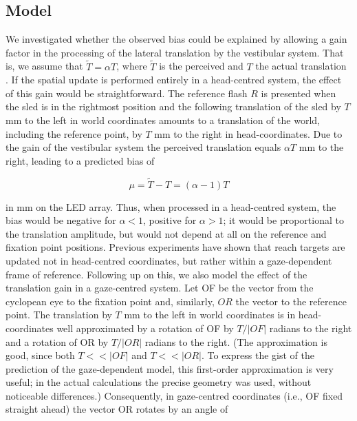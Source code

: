 \subsection{Model}
\label{p2:sec:model}

We investigated whether the observed bias could be explained by allowing a gain factor in the processing of the lateral translation by the vestibular system. That is, we assume that $\tilde{T} = {\alpha}T$, where $\tilde{T}$ is the perceived and $T$ the actual translation \cite{medendorp1999}. If the spatial update is performed entirely in a head-centred system, the effect of this gain would be straightforward. The reference flash $R$ is presented when the sled is in the rightmost position and the following translation of the sled by $T$ mm to the left in world coordinates amounts to a translation of the world, including the reference point, by $T$ mm to the right in head-coordinates. Due to the gain of the vestibular system the perceived translation equals ${\alpha}T$ mm to the right, leading to a predicted bias of

\begin{equation}
\label{p2:eq2}
\mu = \tilde{T} - T = (\alpha - 1) T
\end{equation}

in mm on the LED array. Thus, when processed in a head-centred system, the bias would be negative for $\alpha < 1$, positive for $\alpha > 1$; it would be proportional to the translation amplitude, but would not depend at all on the reference and fixation point positions.
Previous experiments \cite{vanpelt2007} have shown that reach targets are updated not in head-centred coordinates, but rather within a gaze-dependent frame of reference. Following up on this, we also model the effect of the translation gain in a gaze-centred system. Let OF be the vector from the cyclopean eye to the fixation point and, similarly, $OR$ the vector to the reference point. The translation by $T$ mm to the left in world coordinates is in head-coordinates well approximated by a rotation of OF by $T/|OF|$ radians to the right and a rotation of OR by $T/|OR|$ radians to the right. (The approximation is good, since both $T<<|OF|$ and $T<<|OR|$. To express the gist of the prediction of the gaze-dependent model, this first-order approximation is very useful; in the actual calculations the precise geometry was used, without noticeable differences.)  Consequently, in gaze-centred coordinates (i.e., OF fixed straight ahead) the vector OR rotates by an angle of 

